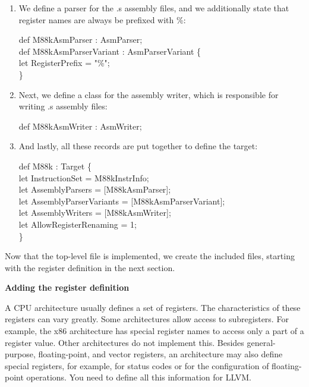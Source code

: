 \begin{enumerate}
\item We define a parser for the .s assembly files, and we additionally state that register names are always be prefixed with \%:
\begin{tcolorbox}[colback=white,colframe=black]
def M88kAsmParser : AsmParser; \\
def M88kAsmParserVariant : AsmParserVariant \{ \\
\hspace*{1cm}let RegisterPrefix = "\%"; \\
\}
\end{tcolorbox}

\item Next, we define a class for the assembly writer, which is responsible for writing .s assembly files:
\begin{tcolorbox}[colback=white,colframe=black]
def M88kAsmWriter : AsmWriter;
\end{tcolorbox}

\item And lastly, all these records are put together to define the target:
\begin{tcolorbox}[colback=white,colframe=black]
def M88k : Target \{ \\
\hspace*{1cm}let InstructionSet = M88kInstrInfo; \\
\hspace*{1cm}let AssemblyParsers = [M88kAsmParser]; \\
\hspace*{1cm}let AssemblyParserVariants = [M88kAsmParserVariant]; \\
\hspace*{1cm}let AssemblyWriters = [M88kAsmWriter]; \\
\hspace*{1cm}let AllowRegisterRenaming = 1; \\
\}
\end{tcolorbox}

\end{enumerate}

Now that the top-level file is implemented, we create the included files, starting with the register definition in the next section.\par

\hspace*{\fill} \par %
\textbf{Adding the register definition}

A CPU architecture usually defines a set of registers. The characteristics of these registers can vary greatly. Some architectures allow access to subregisters. For example, the x86 architecture has special register names to access only a part of a register value. Other architectures do not implement this. Besides general-purpose, floating-point, and vector registers, an architecture may also define special registers, for example, for status codes or for the configuration of floating-point operations. You need to define all this information for LLVM.\par

